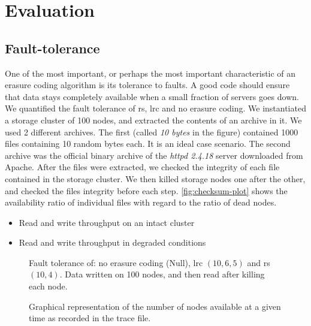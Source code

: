 \section{Evaluation}
\label{sec:evaluation}

\subsection{Fault-tolerance}
\label{subsec:fault-tolerance}

One of the most important, or perhaps the most important characteristic of an erasure coding algorithm is its tolerance to faults.
A good code should ensure that data stays completely available when a small fraction of servers goes down.
We quantified the fault tolerance of \acf{rs}, \acf{lrc} and no erasure coding.
We instantiated a storage cluster of 100 nodes, and extracted the contents of an archive in it.
We used 2 different archives.
The first (called \textit{10 bytes} in the figure) contained 1000 files containing 10 random bytes each.
It is an ideal case scenario.
The second archive was the official binary archive of the \textit{httpd 2.4.18} server downloaded from Apache.
After the files were extracted, we checked the integrity of each file contained in the storage cluster.
We then killed storage nodes one after the other, and checked the files integrity before each step.
\autoref{fig:checksum-plot} shows the availability ratio of individual files with regard to the ratio of dead nodes.


\begin{itemize}
    \item Read and write throughput on an intact cluster
    \item Read and write throughput in degraded conditions
    \
\end{itemize}

\begin{figure}
    \centering
    
    \caption{Fault tolerance of: no erasure coding (Null), \acl{lrc} $\left(10,6,5\right)$ and \acl{rs} $\left(10,4\right)$. Data written on 100 nodes, and then read after killing each node.}
    \label{fig:checksum-plot}
\end{figure}

\begin{figure*}
    \centering
    
    \caption{Graphical representation of the number of nodes available at a given time as recorded in the trace file.}
    \label{fig:trace-plot}
\end{figure*}
